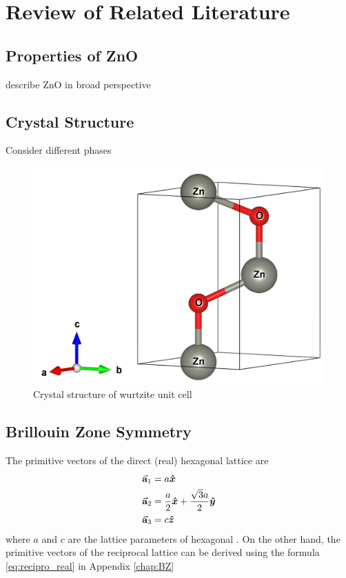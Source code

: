 \chapter{Review of Related Literature}
\section{Properties of ZnO}
    describe ZnO in broad perspective
\section{Crystal Structure}
Consider different phases

\begin{figure}[tbh!] 
	\centering
	\includegraphics[width=0.5\linewidth]{"images/rrl/ZnO_unit"}
	\caption[Crystal structure of wurtzite  unit cell]{Crystal structure of wurtzite  unit cell}
	\label{fig:ZnO_unit}
\end{figure}

\section{Brillouin Zone Symmetry}
	The primitive vectors of the direct (real) hexagonal lattice are 
\begin{align}
	\va{a}_1 &= a \vu*{x}	\\
	\va{a}_2 &= \frac{a}{2} \vu*{x} + \frac{\sqrt{3}a}{2} \vu*{y} \\
	\va{a}_3 &= c \vu*{z}
\end{align}
where $a$ and $c$ are the lattice parameters of hexagonal . On the other hand, the primitive vectors of the reciprocal lattice can be derived using the formula \eqref{eq:recipro_real} in Appendix \ref{chap:BZ} 

